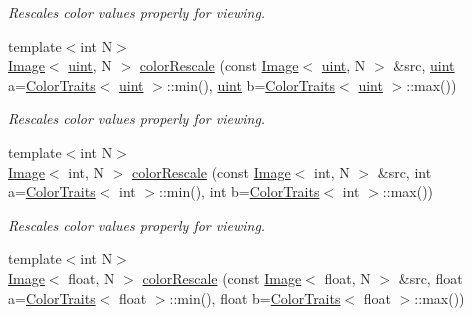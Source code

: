 \begin{DoxyCompactItemize}
\begin{DoxyCompactList}\small\item\em Rescales color values properly for viewing. \end{DoxyCompactList}\item 
\hypertarget{group___image_ga465663977e6c21ceb263a6cb6289ed59}{{\footnotesize template$<$int N$>$ }\\\hyperlink{class_d_o_1_1_image}{Image}$<$ \hyperlink{group___eigen_typedefs_ga91ad9478d81a7aaf2593e8d9c3d06a14}{uint}, N $>$ \hyperlink{group___image_ga465663977e6c21ceb263a6cb6289ed59}{color\-Rescale} (const \hyperlink{class_d_o_1_1_image}{Image}$<$ \hyperlink{group___eigen_typedefs_ga91ad9478d81a7aaf2593e8d9c3d06a14}{uint}, N $>$ \&src, \hyperlink{group___eigen_typedefs_ga91ad9478d81a7aaf2593e8d9c3d06a14}{uint} a=\hyperlink{struct_d_o_1_1_color_traits}{Color\-Traits}$<$ \hyperlink{group___eigen_typedefs_ga91ad9478d81a7aaf2593e8d9c3d06a14}{uint} $>$\-::min(), \hyperlink{group___eigen_typedefs_ga91ad9478d81a7aaf2593e8d9c3d06a14}{uint} b=\hyperlink{struct_d_o_1_1_color_traits}{Color\-Traits}$<$ \hyperlink{group___eigen_typedefs_ga91ad9478d81a7aaf2593e8d9c3d06a14}{uint} $>$\-::max())}\label{group___image_ga465663977e6c21ceb263a6cb6289ed59}

\begin{DoxyCompactList}\small\item\em Rescales color values properly for viewing. \end{DoxyCompactList}\item 
\hypertarget{group___image_gac3b1da175cc8d5ec00abf01554aba92a}{{\footnotesize template$<$int N$>$ }\\\hyperlink{class_d_o_1_1_image}{Image}$<$ int, N $>$ \hyperlink{group___image_gac3b1da175cc8d5ec00abf01554aba92a}{color\-Rescale} (const \hyperlink{class_d_o_1_1_image}{Image}$<$ int, N $>$ \&src, int a=\hyperlink{struct_d_o_1_1_color_traits}{Color\-Traits}$<$ int $>$\-::min(), int b=\hyperlink{struct_d_o_1_1_color_traits}{Color\-Traits}$<$ int $>$\-::max())}\label{group___image_gac3b1da175cc8d5ec00abf01554aba92a}

\begin{DoxyCompactList}\small\item\em Rescales color values properly for viewing. \end{DoxyCompactList}\item 
\hypertarget{group___image_gae3dde5569ec14946867c7b62b3062956}{{\footnotesize template$<$int N$>$ }\\\hyperlink{class_d_o_1_1_image}{Image}$<$ float, N $>$ \hyperlink{group___image_gae3dde5569ec14946867c7b62b3062956}{color\-Rescale} (const \hyperlink{class_d_o_1_1_image}{Image}$<$ float, N $>$ \&src, float a=\hyperlink{struct_d_o_1_1_color_traits}{Color\-Traits}$<$ float $>$\-::min(), float b=\hyperlink{struct_d_o_1_1_color_traits}{Color\-Traits}$<$ float $>$\-::max())}\label{group___image_gae3dde5569ec14946867c7b62b3062956}


\end{DoxyCompactItemize}

